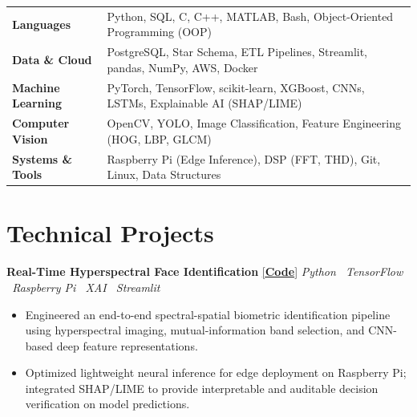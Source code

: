 \documentclass[10pt]{article}
\newcommand{\project}[3]{%
    \noindent
    \textbf{#1}
    \hspace{2pt}
    \href{#2}{\small[\textbf{Code}]}
    \hfill
    {\small\emph{#3}}
    \par
    \vspace{1pt}
}
\begin{document}
\begin{tabularx}{\linewidth}{@{}l@{\hspace{12pt}}X@{}}

\textbf{\small Languages}
&
{\small Python, SQL, C, C++, MATLAB, Bash, Object-Oriented Programming (OOP)}
\\[2pt]

\textbf{\small Data \& Cloud}
&
{\small PostgreSQL, Star Schema, ETL Pipelines, Streamlit, pandas, NumPy, AWS, Docker}
\\[2pt]

\textbf{\small Machine Learning}
&
{\small PyTorch, TensorFlow, scikit-learn, XGBoost, CNNs, LSTMs, Explainable AI (SHAP/LIME)}
\\[2pt]

\textbf{\small Computer Vision}
&
{\small OpenCV, YOLO, Image Classification, Feature Engineering (HOG, LBP, GLCM)}
\\[2pt]

\textbf{\small Systems \& Tools}
&
{\small Raspberry Pi (Edge Inference), DSP (FFT, THD), Git, Linux, Data Structures}

\end{tabularx}

\section{Technical Projects}

\project
{Real-Time Hyperspectral Face Identification}
{https://github.com/niranjan-crypt/Hyperspectral-Face-Identification-XAI}
{Python \textbullet\ TensorFlow \textbullet\ Raspberry Pi \textbullet\ XAI \textbullet\ Streamlit}

\begin{itemize}

\item Engineered an end-to-end spectral-spatial biometric identification pipeline using hyperspectral imaging, mutual-information band selection, and CNN-based deep feature representations.

\item Optimized lightweight neural inference for edge deployment on Raspberry Pi; integrated SHAP/LIME to provide interpretable and auditable decision verification on model predictions.

\end{itemize}
\end{document}
